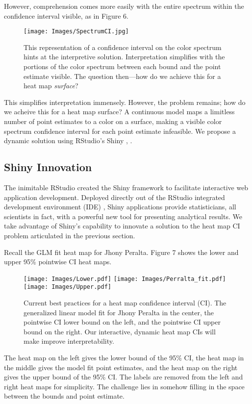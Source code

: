 However, comprehension comes more easily with the entire spectrum within the confidence interval visible, as in Figure 6.
  \begin{figure}[H]
  \centering
	\texttt{[image: Images/SpectrumCI.jpg]}
	\caption{This representation of a confidence interval on the color spectrum hints at the interpretive solution. Interpretation simplifies with the portions of the color spectrum between each bound and the point estimate visible. The question then---how do we achieve this for a heat map {\it surface}?}
	\end{figure}
This simplifies interpretation immensely. However, the problem remains; how do we acheive this for a heat map surface? A continuous model maps a limitless number of point estimates to a color on a surface, making a visible color spectrum confidence interval for each point estimate infeasible. We propose a dynamic solution using RStudio's Shiny \citep{Shiny}, \citep{RStudio}.

\subsection{Shiny Innovation}

The inimitable RStudio created the Shiny framework to facilitate interactive web application development. Deployed directly out of the RStudio integrated development environment (IDE) \citep{IDE}, Shiny applications provide statisticians, all scientists in fact, with a powerful new tool for presenting analytical results. We take advantage of Shiny's capability to innovate a solution to the heat map CI problem articulated in the previous section.

Recall the GLM fit heat map for Jhony Peralta. Figure 7 shows the lower and upper 95\% pointwise CI heat maps.

  \begin{figure}[H]
	\centering
	\texttt{[image: Images/Lower.pdf]}
	\texttt{[image: Images/Perralta\_fit.pdf]}
	\texttt{[image: Images/Upper.pdf]}
	\caption{Current best practices for a heat map confidence interval (CI). The generalized linear model fit for Jhony Peralta in the center, the pointwise CI lower bound on the left, and the pointwise CI upper bound on the right. Our interactive, dynamic heat map CIs will make improve interpretability.}
	\end{figure}
The heat map on the left gives the lower bound of the 95\% CI, the heat map in the middle gives the model fit point estimates, and the heat map on the right gives the upper bound of the 95\% CI. The labels are removed from the left and right heat maps for simplicity. The challenge lies in somehow filling in the space between the bounds and point estimate.

